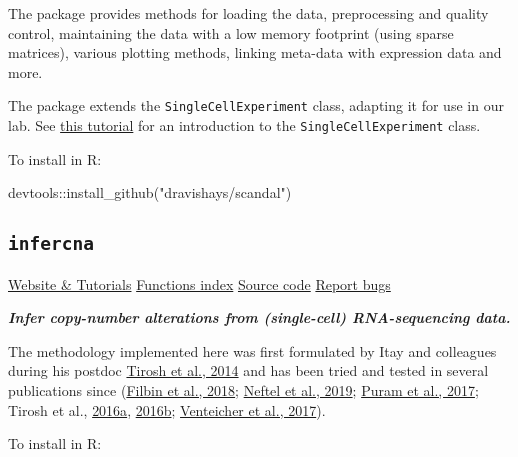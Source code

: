 \documentclass[
]{book}
\newenvironment{Shaded}{\begin{snugshade}}{\end{snugshade}}
\newcommand{\FunctionTok}[1]{\textcolor[rgb]{0.00,0.00,0.00}{#1}}
\newcommand{\NormalTok}[1]{#1}
\newcommand{\SpecialCharTok}[1]{\textcolor[rgb]{0.00,0.00,0.00}{#1}}
\newcommand{\StringTok}[1]{\textcolor[rgb]{0.31,0.60,0.02}{#1}}
\begin{document}
The package provides methods for loading the data, preprocessing and quality control, maintaining the data with a low memory footprint (using sparse matrices), various plotting methods, linking meta-data with expression data and more.

The package extends the \texttt{SingleCellExperiment} class, adapting it for use in our lab. See \href{https://www.bioconductor.org/packages/release/bioc/vignettes/SingleCellExperiment/inst/doc/intro.html}{this tutorial} for an introduction to the \texttt{SingleCellExperiment} class.

To install in R:

\begin{Shaded}
\begin{Highlighting}[]
\NormalTok{devtools}\SpecialCharTok{::}\FunctionTok{install\_github}\NormalTok{(}\StringTok{"dravishays/scandal"}\NormalTok{)}
\end{Highlighting}
\end{Shaded}

\hypertarget{infercna}{%
\subsection{\texorpdfstring{\texttt{infercna}}{infercna}}\label{infercna}}

\href{https://jlaffy.github.io/infercna}{Website \& Tutorials} \textbar{} \href{https://jlaffy.github.io/infercna/reference/index.html}{Functions index} \textbar{} \href{https://github.com/jlaffy/infercna}{Source code} \textbar{} \href{https://github.com/jlaffy/infercna/issues}{Report bugs}

\emph{\textbf{Infer copy-number alterations from (single-cell) RNA-sequencing data.}}

The methodology implemented here was first formulated by Itay and colleagues during his postdoc \href{https://science.sciencemag.org/content/344/6190/1396.long}{Tirosh et al., 2014} and has been tried and tested in several publications since (\href{https://science.sciencemag.org/content/360/6386/331.long}{Filbin et al., 2018}; \href{https://www.ncbi.nlm.nih.gov/pubmed/31327527}{Neftel et al., 2019}; \href{https://www.ncbi.nlm.nih.gov/pubmed/29198524}{Puram et al., 2017}; Tirosh et al., \href{https://science.sciencemag.org/content/352/6282/189.long}{2016a}, \href{https://www.nature.com/articles/nature20123}{2016b}; \href{https://science.sciencemag.org/content/355/6332/eaai8478.long}{Venteicher et al., 2017}).

To install in R:
\end{document}
